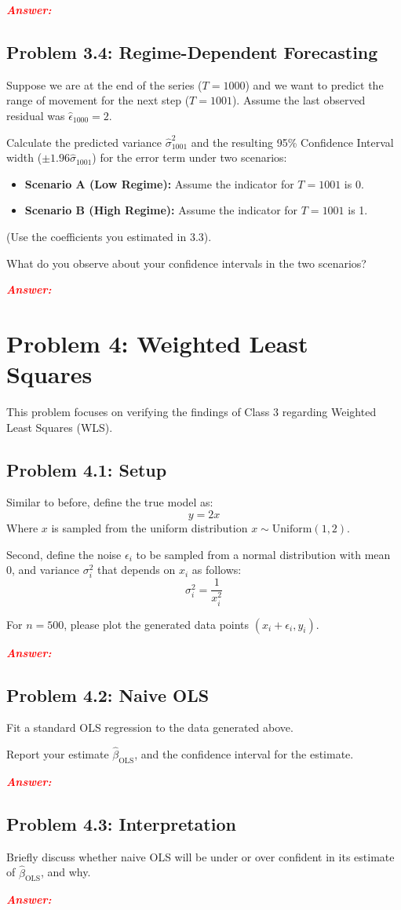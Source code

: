 \documentclass[11pt, letterpaper]{article}
\newcommand{\problem}[1]{\section*{Problem #1}}
\newcommand{\subproblem}[1]{\subsection*{Problem #1}}
\newcommand{\answer}{\textbf{\textit{\textcolor{red}{Answer:}}}\\}
\begin{document}
\answer

\subproblem{3.4: Regime-Dependent Forecasting}
Suppose we are at the end of the series ($T=1000$) and we want to predict the range of movement for the next step ($T=1001$).
Assume the last observed residual was $\hat{\epsilon}_{1000} = 2$.

Calculate the predicted variance $\hat{\sigma}_{1001}^2$ and the resulting 95\% Confidence Interval width ($\pm 1.96 \hat{\sigma}_{1001}$) for the error term under two scenarios:
\begin{itemize}
    \item \textbf{Scenario A (Low Regime):} Assume the indicator for $T=1001$ is 0.
    \item \textbf{Scenario B (High Regime):} Assume the indicator for $T=1001$ is 1.
\end{itemize}
(Use the coefficients you estimated in 3.3).

What do you observe about your confidence intervals in the two scenarios?

\answer

\problem{4: Weighted Least Squares}

This problem focuses on verifying the findings of Class 3 regarding
Weighted Least Squares (WLS).

\subproblem{4.1: Setup}

Similar to before, define the true model as:
$$
y = 2x
$$
Where $x$ is sampled from the uniform distribution $x \sim \text{Uniform}(1, 2)$.

Second, define the noise $\epsilon_i$ to be sampled from a normal distribution with mean 0,
and variance $\sigma_i^2$ that depends on $x_i$ as follows:
$$
\sigma_i^2 = \frac{1}{x_i^2}
$$

For $n=500$, please plot the generated data points $(x_i + \epsilon_i, y_i)$.

\answer

\subproblem{4.2: Naive OLS}

Fit a standard OLS regression to the data generated above.

Report your estimate $\hat{\beta}_{\text{OLS}}$, and the confidence interval for the estimate.

\answer

\subproblem{4.3: Interpretation}

Briefly discuss whether naive OLS will be under or over confident in its estimate of $\hat{\beta}_{\text{OLS}}$,
and why.

\answer
\end{document}
